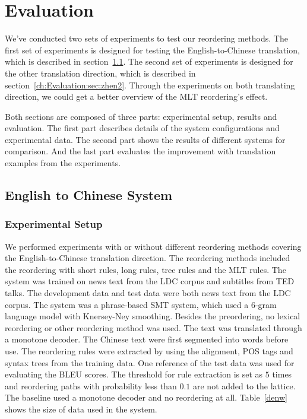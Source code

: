 
\chapter{Evaluation}
\label{ch:Evaluation}

We've conducted two sets of experiments to test our reordering methods. The first set of experiments is designed for testing the English-to-Chinese translation, which is described in section~\ref{ch:Evaluation:sec:enw}. The second set of experiments is designed for the other translation direction, which is described in section~\ref{ch:Evaluation:sec:zhen2}. Through the experiments on both translating direction, we could get a better overview of the \ac{MLT} reordering's effect.

Both sections are composed of three parts: experimental setup, results and evaluation. The first part describes details of the system configurations and experimental data. The second part shows the results of different systems for comparison. And the last part evaluates the improvement with translation examples from the experiments.


\section{English to Chinese System}
\label{ch:Evaluation:sec:enw}

\subsection{Experimental Setup}
We performed experiments with or without different reordering methods covering the English-to-Chinese translation direction. The reordering methods included the reordering with short rules, long rules, tree rules and the \ac{MLT} rules. The system was trained on news text from the \acs{LDC} corpus and subtitles from \acs{TED} talks. The development data and test data were both news text from the \acs{LDC} corpus. The system was a phrase-based \ac{SMT} system, which used a $6$-gram language model with Knersey-Ney smoothing. Besides the preordering, no lexical reordering or other reordering method was used. The text was translated through a monotone decoder. The Chinese text were first segmented into words before use.
The reordering rules were extracted by using the alignment, POS tags and syntax trees from the training data. One reference of the test data was used for evaluating the \ac{BLEU} scores. The threshold for rule extraction is set as $5$ times and reordering paths with probability less than $0.1$ are not added to the lattice. The baseline used a monotone decoder and no reordering at all. Table~\ref{denw} shows the size of data used in the system. %

